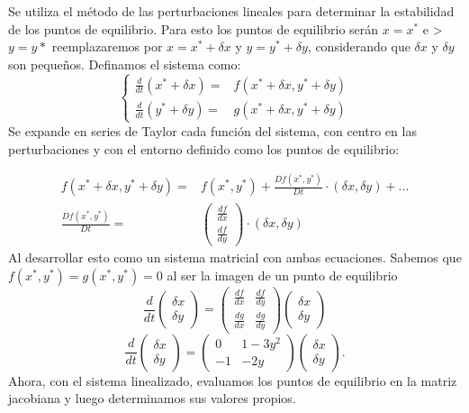 \documentclass[../portafolio.tex]{subfiles}
\begin{document}
Se utiliza el método de las perturbaciones lineales \citep{ODE,Bender1978} para determinar la estabilidad de los puntos de equilibrio. Para esto los puntos de equilibrio serán $x=x^*$ e >$y=y*$ reemplazaremos por $x=x^* +\delta x$ y $y=y^*+ \delta y$, considerando que $\delta x$ y  $\delta y$ son pequeños.
Definamos el sistema como:
\[
\begin{cases}
\frac{d}{dt}(x^* + \delta x)=& f(x^* +\delta x, y^* + \delta y)\\
\frac{d}{dt}(y^* + \delta y)=& g(x^* +\delta x, y^* + \delta y)
\end{cases}
\]
Se expande en series de Taylor cada función del sistema, con centro en las perturbaciones y con el entorno definido como los puntos de equilibrio:

\begin{align}
f(x^* +\delta x, y^* + \delta y)=& f(x^*,y^*) + \frac{Df(x^*,y^*)}{Dt}\cdot (\delta x, \delta y)+...\\
\frac{Df(x^*,y^*)}{Dt}=& \left(
\begin{matrix}
\frac{df}{dx} \\
\frac{df}{dy} 
\end{matrix}\right) \cdot (\delta x, \delta y)
\end{align}
Al desarrollar esto como un sistema matricial con ambas ecuaciones. Sabemos que $f(x^*,y^*) = g(x^*,y^*)= 0$ al ser la imagen de un punto de equilibrio
\[ 
\frac{d}{dt} 
\begin{pmatrix} 
\delta x \\ 
\delta y 
\end{pmatrix} 
= 
\begin{pmatrix} 
\frac{df}{dx} & \frac{df}{dy}  \\ 
\frac{dg}{dx}  & \frac{dg}{dy}  
\end{pmatrix} 
\begin{pmatrix} 
\delta x \\ 
\delta y 
\end{pmatrix} 
\]
\[ 
\frac{d}{dt} 
\begin{pmatrix} 
\delta x \\ 
\delta y 
\end{pmatrix} 
= 
\begin{pmatrix} 
0 & 1-3y^2  \\ 
-1  & -2y  
\end{pmatrix} 
\begin{pmatrix} 
\delta x \\ 
\delta y 
\end{pmatrix} .
\]
Ahora, con el sistema linealizado, evaluamos los puntos de equilibrio en la matriz jacobiana y luego determinamos sus valores propios.
\end{document}
